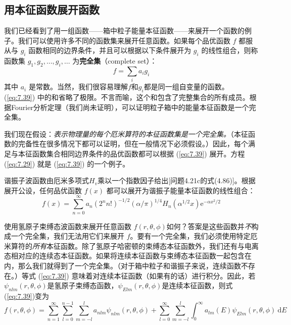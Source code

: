 \subsection*{用本征函数展开函数}

     我们已经看到了用一组函数——箱中粒子能量本征函数——来展开一个函数的例子。我们可以使用许多不同的函数集来展开任意函数。如果每个品优函数 $f$ 都服从与 $g_i$ 函数相同的边界条件，并且可以根据以下条件展开为 $g_i$ 的线性组合，则称函数集 $g_1,g_2,\ldots,g_i,\ldots$ 为\textbf{完全集}（complete set）：
    \begin{equation}
        f = \sum_{i}a_i g_i
        \label{eq:7.39}
    \end{equation}
    其中 $a_i$ 是常数。当然，我们很容易理解$f$和$g_i$都是同一组自变量的函数。(\ref{eq:7.39}) 中的和省略了极限。不言而喻，这个和包含了完整集合的所有成员。根据Fourier分析定理（我们尚未证明），可以证明粒子箱中的能量本征函数是一个完全集。

    我们现在假设：\textit{表示物理量的每个厄米算符的本征函数集是一个完全集。}（本征函数的完备性在很多情况下都可以证明，但在一般情况下必须假设。）因此，每个满足与本征函数集合相同边界条件的品优函数都可以根据 (\ref{eq:7.39}) 展开。方程 (\ref{eq:7.29}) 就是 (\ref{eq:7.39}) 的一个例子。

    谐振子波函数由厄米多项式$H_v$乘以一个指数因子给出[问题4.21c的式(4.86)]。根据展开公设，任何品优函数 $f\left(x\right)$ 都可以展开为谐振子能量本征函数的线性组合：
    \begin{equation*}
        f\left(x\right) = \sum_{n=0}^{\infty}a_n\left(2^nn!\right)^{-1/2}\left(\alpha/\pi\right)^{1/4}H_n\left(\alpha^{1/2}x\right)\mathrm{e}^{-\alpha x^2/2}
    \end{equation*}

    使用氢原子束缚态波函数来展开任意函数 $f\left(r,\theta,\phi\right)$如何？答案是这些函数并\textit{不}构成一个完全集，我们无法用它们来展开 $f$。要有一个完全集，我们必须使用特定厄米算符的\textit{所有}本征函数。除了氢原子哈密顿的束缚态本征函数外，我们还有与电离态相对应的连续态本征函数。如果将连续本征函数与束缚态本征函数一起包含在内，那么我们就得到了一个完全集。（对于箱中粒子和谐振子来说，连续函数不存在。）等式 (\ref{eq:7.39}) 意味着对连续本征函数（如果有的话）进行积分。因此，若$\psi_{nlm}\left(r,\theta,\phi\right)$是氢原子束缚态函数，$\psi_{Elm}\left(r,\theta,\phi\right)$是连续本征函数，则式(\ref{eq:7.39})变为
    \begin{equation*}
        f\left(r,\theta,\phi\right) = \sum_{n=1}^{\infty}\sum_{l=0}^{n-1}\sum_{m=-l}^{l}a_{nlm}\psi_{nlm}\left(r,\theta,\phi\right) + \sum_{l=0}^{\infty}\sum_{m=-l}^{l}\int_{0}^{\infty} a_{lm}\left(E\right) \psi_{Elm}\left(r,\theta,\phi\right) \:\mathrm{d}E
    \end{equation*}


